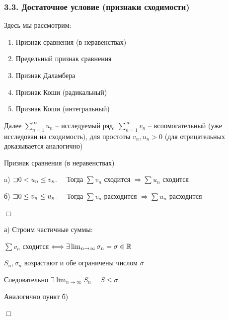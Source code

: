 \documentclass[12pt]{article}
\begin{document}
    \subsubsection{3.3. Достаточное условие (признаки сходимости)}

    Здесь мы рассмотрим:

    \begin{enumerate}
        \item Признак сравнения (в неравенствах)
        \item Предельный признак сравнения
        \item Признак Даламбера
        \item Признак Коши (радикальный)
        \item Признак Коши (интегральный)
    \end{enumerate}

    Далее $\sum_{n = 1}^\infty u_n$ -- исследуемый ряд, $\sum_{n = 1}^\infty v_n$ -- вспомогательный (уже исследован на сходимость),
    для простоты $v_n, u_n > 0$ (для отрицательных доказывается аналогично)

    \mediumvspace

    \hypertarget{comparisonsign}{}

    \begin{MyTheorem}
         Признак сравнения (в неравенствах)

        a) $\mathord{\sqsupset} 0 < u_n \leq v_n. \quad$ Тогда $\sum v_n$ сходится $\Longrightarrow \sum u_n$ сходится

        б) $\mathord{\sqsupset} 0 \leq v_n \leq u_n. \quad$ Тогда $\sum v_n$ расходится $\Longrightarrow \sum u_n$ расходится
    \end{MyTheorem}

    \begin{MyProof}
        $\Box$

        а) Строим частичные суммы:

        $\sum v_n$ сходится $\Longleftrightarrow \exists \lim_{n \to \infty} \sigma_n = \sigma \in \mathbb{R}$

        $S_n, \sigma_n$ возрастают и обе ограничены числом $\sigma$

        Следовательно $\exists \lim_{n \to \infty} S_n = S \leq \sigma$

        Аналогично пункт б)

        $\Box$
    \end{MyProof}

    \hypertarget{limitcomparisonsign}{}
\end{document}
